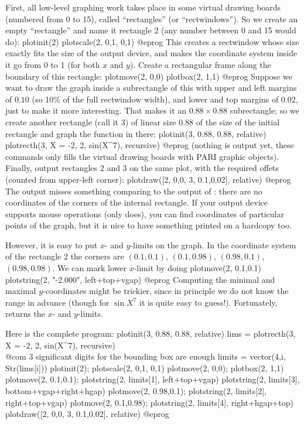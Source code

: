 First, all low-level graphing work takes place in some virtual drawing
boards (numbered from 0 to 15), called ``rectangles'' (or ``rectwindows'').
So we create an empty ``rectangle'' and name it rectangle 2 (any
number between 0 and 15 would do):
\bprog
plotinit(2)
plotscale(2, 0,1, 0,1)
@eprog
This creates a rectwindow whose size exactly fits the size of the output
device, and makes the coordinate system inside it go from 0 to 1 (for both
$x$ and $y$). Create a rectangular frame along the boundary of this rectangle:
\bprog
plotmove(2, 0,0)
plotbox(2, 1,1)
@eprog
Suppose we want to draw the graph inside a subrectangle of this with upper
and left margins of $0.10$ (so 10\% of the full rectwindow width), and
lower and top margins of $0.02$, just to make it more interesting. That
makes it an $0.88 \times 0.88$ subrectangle; so we create another rectangle
(call it 3) of linear size 0.88 of the size of the initial rectangle and
graph the function in there:
\bprog
plotinit(3, 0.88, 0.88, relative)
plotrecth(3, X = -2, 2, sin(X^7), recursive)
@eprog
(nothing is output yet, these commands only fills the virtual drawing
boards with PARI graphic objects). Finally, output rectangles 2 and 3 on
the same plot, with the required offets (counted from upper-left corner):
\bprog
plotdraw([2, 0,0,  3, 0.1,0.02], relative)
@eprog
\noindent The output misses something comparing to the output of
: there are no coordinates of the corners of the internal
rectangle.  If your output device supports mouse operations (only
 does), you can find coordinates of particular points of the
graph, but it is nice to have something printed on a hardcopy too.

However, it is easy to put $x$- and $y$-limits on the graph.  In the
coordinate system of the rectangle 2 the corners are $(0.1,0.1)$,
$(0.1,0.98)$, $(0.98,0.1)$, $(0.98,0.98)$.  We can mark lower $x$-limit by
doing
\bprog
plotmove(2, 0.1,0.1)
plotstring(2, "-2.000", left+top+vgap)
@eprog\noindent
Computing the minimal and maximal $y$-coordinates might be trickier, since
in principle we do not know the range in advance (though for $\sin X^7$ it
is quite easy to guess!). Fortunately,  returns the $x$- and
$y$-limits.

Here is the complete program:
\bprog
plotinit(3, 0.88, 0.88, relative)
lims = plotrecth(3, X = -2, 2, sin(X^7), recursive)
          \\ @com $3$ significant digits for the bounding box are enough
limits = vector(4,i, Str(lims[i]))
plotinit(2);      plotscale(2, 0,1, 0,1)
plotmove(2, 0,0); plotbox(2, 1,1)
plotmove(2, 0.1,0.1);
plotstring(2, limits[1], left+top+vgap)
plotstring(2, limits[3], bottom+vgap+right+hgap)
plotmove(2, 0.98,0.1); plotstring(2, limits[2], right+top+vgap)
plotmove(2, 0.1,0.98); plotstring(2, limits[4], right+hgap+top)
plotdraw([2, 0,0,  3, 0.1,0.02], relative)
@eprog


